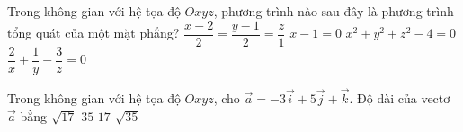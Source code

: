 \begin{ex}%
	Trong không gian với hệ tọa độ $Oxyz$, phương trình nào sau đây là phương trình tổng quát của một mặt phẳng?
	\choice
		{$\dfrac{x-2}{2}=\dfrac{y-1}{2}=\dfrac{z}{1}$}
		{\True $x-1=0$}
		{$x^2+y^2+z^2-4=0$}
		{$\dfrac{2}{x}+\dfrac{1}{y}-\dfrac{3}{z}=0$}
\end{ex}

\begin{ex}%
	Trong không gian với hệ tọa độ $Oxyz$, cho $\vec{a}=-3\vec{i}+5\vec{j}+\vec{k}$. Độ dài của vectơ $\vec{a}$ bằng
	\choice
		{$\sqrt{17}$}
		{$35$}
		{$17$}
		{\True $\sqrt{35}$}
\end{ex}

